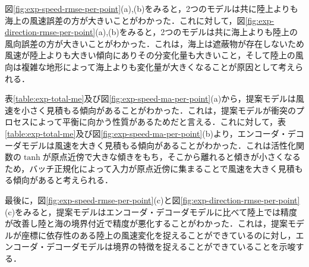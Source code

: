 図\ref{fig:exp-speed-rmse-per-point}(a),(b)をみると，2つのモデルは共に陸上よりも海上の風速誤差の方が大きいことがわかった．これに対して，図\ref{fig:exp-direction-rmse-per-point}(a),(b)をみると，2つのモデルは共に海上よりも陸上の風向誤差の方が大きいことがわかった．これは，海上は遮蔽物が存在しないため風速が陸上よりも大きい傾向にありその分変化量も大きいこと，そして陸上の風向は複雑な地形によって海上よりも変化量が大きくなることが原因として考えられる．

表\ref{table:exp-total-me}及び図\ref{fig:exp-speed-ma-per-point}(a)から，提案モデルは風速を小さく見積もる傾向があることがわかった．これは，提案モデルが衝突のプロセスによって平衡に向かう性質があるためだと言える．これに対して，表\ref{table:exp-total-me}及び図\ref{fig:exp-speed-ma-per-point}(b)より，エンコーダ・デコーダモデルは風速を大きく見積もる傾向があることがわかった．これは活性化関数の$\tanh$が原点近傍で大きな傾きをもち，そこから離れると傾きが小さくなるため，バッチ正規化によって入力が原点近傍に集まることで風速を大きく見積もる傾向があると考えられる．

最後に，図\ref{fig:exp-speed-rmse-per-point}(c)と図\ref{fig:exp-direction-rmse-per-point}(c)をみると，提案モデルはエンコーダ・デコーダモデルに比べて陸上では精度が改善し陸と海の境界付近で精度が悪化することがわかった．これは，提案モデルが座標に依存性のある陸上の風速変化を捉えることができているのに対し，エンコーダ・デコーダモデルは境界の特徴を捉えることができていることを示唆する．

